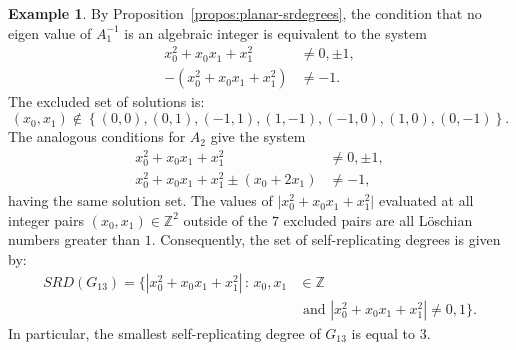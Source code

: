 \documentclass[draft]{adm-paper}
\theoremstyle{definition}
\newtheorem{example}{Example}
\begin{document}
\begin{example}
By Proposition~\ref{propos:planar-srdegrees}, the condition that no eigen value of $A_1^{-1}$ is an algebraic integer
is equivalent to the system
\begin{align*}
x_{0}^{2} + x_{0}x_1 + x_{1}^2 & \neq 0, \pm 1, \\
-(x_{0}^{2} + x_{0}x_1 + x_{1}^2)  & \neq -1.
\end{align*}
The excluded set of solutions is:
\[
(x_0, x_1) \notin
\left\{(0, 0), \left(0, 1\right), \left(-1, 1\right), \left(1, -1\right), \left(-1, 0\right), \left(1, 0\right), \left(0, -1\right)\right\}.
\]
The analogous conditions for $A_2$ give the system
\begin{align*}
x_{0}^{2} + x_{0}x_1 + x_{1}^2 & \neq 0, \pm 1, \\
x_{0}^{2} + x_{0}x_1 + x_{1}^2 \pm (x_0+2x_1) & \neq -1,
\end{align*}
having the same solution set. The values of $\vert{}x_0^2 + x_0x_1 + x_1^2\vert{}$ evaluated at all integer pairs $(x_0, x_1) \in \mathbb{Z}^2$ outside of the $7$ excluded pairs are all L\"oschian numbers greater than $1$. Consequently, the set of self-replicating degrees is given by:
\begin{align*}
SRD(G_{13}) =  \big\{  |x_{0}^{2} + x_{0}x_1 + x_{1}^2| \, :  \, x_0, x_1 & \in \mathbb{Z} \\
 & \text{ and } |x_0^2 + x_0x_1 + x_1^2| \neq 0,1 \big\}.
\end{align*}
In particular, the smallest self-replicating degree of $G_{13}$ is equal to $3$.

%
\end{example}
\end{document}
